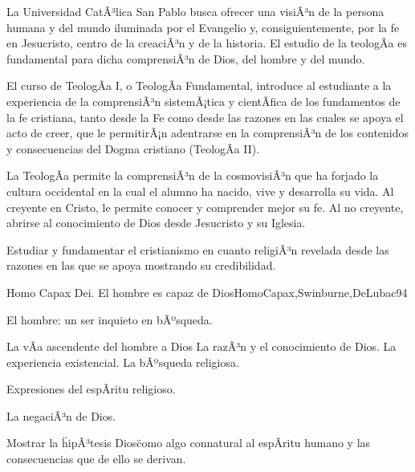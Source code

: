 \begin{syllabus}


\begin{justification}
La Universidad CatÃ³lica San Pablo busca ofrecer una visiÃ³n de la persona humana y del mundo iluminada por el Evangelio y, consiguientemente, por la fe en Jesucristo, centro de la creaciÃ³n y de la historia. El estudio de la teologÃ­a es fundamental para dicha comprensiÃ³n de Dios, del hombre y del mundo.

El curso de TeologÃ­a I, o TeologÃ­a Fundamental, introduce al estudiante a la experiencia de la comprensiÃ³n sistemÃ¡tica y cientÃ­fica de los fundamentos de la fe cristiana, tanto desde la Fe como desde las razones en las cuales se apoya el acto de creer, que le permitirÃ¡n adentrarse en la comprensiÃ³n de los contenidos y consecuencias del Dogma cristiano (TeologÃ­a II).

La TeologÃ­a permite la comprensiÃ³n de la cosmovisiÃ³n que ha forjado la cultura occidental en la cual el alumno ha nacido, vive y desarrolla su vida. Al creyente en Cristo, le permite conocer y comprender mejor su fe. Al no creyente, abrirse al conocimiento de Dios desde Jesucristo y su Iglesia.
\end{justification}

\begin{goals}
\item Estudiar y fundamentar el cristianismo en cuanto religiÃ³n revelada desde las razones en las que se apoya mostrando su credibilidad. 
\end{goals}

\begin{outcomes}
\end{outcomes}

\begin{unit}{Homo Capax Dei. El hombre es capaz de Dios}{HomoCapax,Swinburne,DeLubac}{9}{4}
\begin{topics}
	\item El hombre: un ser inquieto en bÃºsqueda.
	\item	La vÃ­a ascendente del hombre a Dios
		\subitem	La razÃ³n y el conocimiento de Dios.
		\subitem	La experiencia existencial.
		\subitem	La bÃºsqueda religiosa.
	\item	Expresiones del espÃ­ritu religioso.
	\item	La negaciÃ³n de Dios.
\end{topics}
\begin{unitgoals}
	\item Mostrar la \"hipÃ³tesis Dios\" como algo connatural al espÃ­ritu humano y las consecuencias que de ello se derivan.
\end{unitgoals}
\end{unit}


\end{syllabus}
